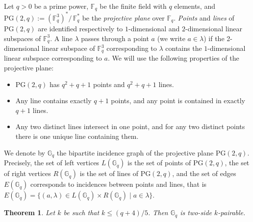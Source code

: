 \documentclass[10pt,a4paper]{article}
\newtheorem{theorem}{Theorem}[section]
\newcommand{\ls}{\leqslant}
\newcommand{\G}[1][q]{\mathbb{G}_{#1}}
\begin{document}
Let $q > 0$ be a prime power, $\mathbb{F}_q$ be the finite field with $q$ elements, and $\mbox{PG}(2,q) := \left(\mathbb{F}_q^3\right)^{*}\!/\, \mathbb{F}_q^{*}$ be the \emph{projective plane} over $\mathbb{F}_q$. \emph{Points} and \emph{lines} of $\mbox{PG}(2,q)$ are identified respectively to $1$-dimensional and $2$-dimensional linear subspaces of $\mathbb{F}_q^3$. A line $\lambda$ passes through a point $a$ (we write $a\in \lambda$) if the 2-dimensional linear subspace of $\mathbb{F}_q^3$ corresponding to $\lambda$ contains the $1$-dimensional linear subspace corresponding to $a$. We will use the following properties of the projective plane:
\begin{itemize}
    \item $\mbox{PG}(2,q)$ has $q^2+q+1$ points and $q^2+q+1$  lines.
    \item Any line contains exactly $q+1$ points, and any point is contained in exactly $q+1$ lines.
    \item Any two distinct lines intersect in  one point, and for any two distinct points there is one unique line containing them.
\end{itemize}

 We denote by $\G$ the bipartite incidence graph of the projective plane $\mbox{PG}(2,q)$.
 Precisely, the set of left vertices  $L(\G)$ is the set of points of $\mbox{PG}(2,q)$, the set of right vertices $R(\G)$ is the set of lines of $\mbox{PG}(2,q)$, and the set of edges $E(\G)$ corresponds to incidences between points and lines, that is $E(\G) = \{(a,\lambda) \in L(\G)\times R(\G) \mid a \in \lambda\}$.

\begin{theorem} \label{theo:bipartite-kpair}
    Let $k$ be such that $k \ls (q+4)/5$. Then $\G$ is two-side $k$-pairable.
\end{theorem}
\end{document}
